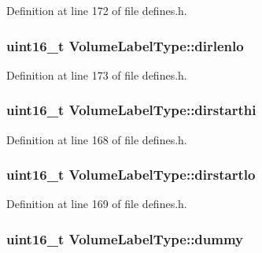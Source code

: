 Definition at line 172 of file defines.\-h.

\hypertarget{structVolumeLabelType_ae1c5205294bf4588b931057d03853d66}{
\subsubsection[{dirlenlo}]{\setlength{\rightskip}{0pt plus 5cm}uint16\-\_\-t Volume\-Label\-Type\-::dirlenlo}}\label{structVolumeLabelType_ae1c5205294bf4588b931057d03853d66}


Definition at line 173 of file defines.\-h.

\hypertarget{structVolumeLabelType_aac87a089bec0cf282bf23038937d7635}{
\subsubsection[{dirstarthi}]{\setlength{\rightskip}{0pt plus 5cm}uint16\-\_\-t Volume\-Label\-Type\-::dirstarthi}}\label{structVolumeLabelType_aac87a089bec0cf282bf23038937d7635}


Definition at line 168 of file defines.\-h.

\hypertarget{structVolumeLabelType_a193c89f442656a080244f284f1bc008a}{
\subsubsection[{dirstartlo}]{\setlength{\rightskip}{0pt plus 5cm}uint16\-\_\-t Volume\-Label\-Type\-::dirstartlo}}\label{structVolumeLabelType_a193c89f442656a080244f284f1bc008a}


Definition at line 169 of file defines.\-h.

\hypertarget{structVolumeLabelType_affbd520c08374524f13708acc05f3f4e}{
\subsubsection[{dummy}]{\setlength{\rightskip}{0pt plus 5cm}uint16\-\_\-t Volume\-Label\-Type\-::dummy}}\label{structVolumeLabelType_affbd520c08374524f13708acc05f3f4e}


